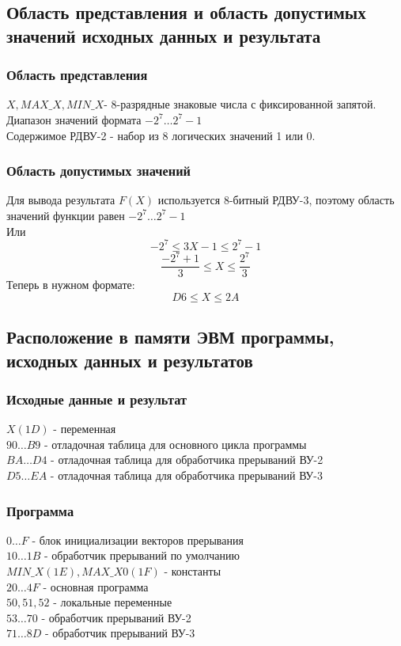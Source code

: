 \subsection{Область представления и область допустимых значений исходных данных и результата}
\subsubsection{Область представления}
\noindent $ X, MAX\_X, MIN\_X $- 8-разрядные знаковые числа с фиксированной запятой. Диапазон значений формата $-2^7\ldots2^7-1$ \\
Содержимое РДВУ-2 - набор из 8 логических значений 1 или 0.

\subsubsection{Область допустимых значений}
\noindent Для вывода результата $ F(X) $ используется 8-битный РДВУ-3, поэтому область значений функции равен $ -2^7\ldots2^7-1 $\\
Или \[ -2^7 \leq 3X - 1 \leq 2^7 -1 \]
\[\frac{-2^7+1}{3}\leq X\leq \frac{2^7}{3}\]
Теперь в нужном формате:
\[D6\leq X\leq 2A\]

\subsection{Расположение в памяти ЭВМ программы, исходных данных и результатов}
\subsubsection{Исходные данные и результат}
\noindent $ X (1D) $ - переменная\\
$90\ldots B9$ - отладочная таблица для основного цикла программы\\
$ BA \ldots  D4$ - отладочная таблица для обработчика прерываний ВУ-2\\
$ D5 \ldots  EA$ - отладочная таблица для обработчика прерываний ВУ-3\\


\subsubsection{Программа}
\noindent$ 0\ldots F $ - блок инициализации векторов прерывания\\
$ 10 \ldots 1B $ - обработчик прерываний по умолчанию\\
$ MIN\_X (1E),MAX\_X0 (1F) $ - константы\\
$ 20\ldots4F $ - основная программа\\
$ 50, 51, 52 $ - локальные переменные\\
$ 53\ldots 70 $ - обработчик прерываний ВУ-2\\
$ 71\ldots8D $ - обработчик прерываний ВУ-3\\


